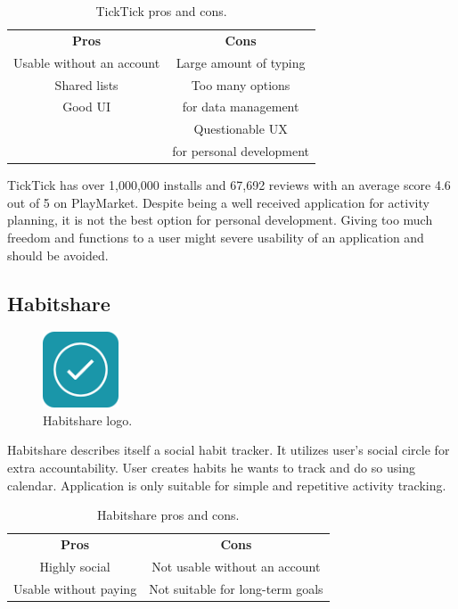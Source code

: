 \begin{table}[h!]
    \centering
    \begin{ctucolortab}
        \begin{tabular}{cc}
            \bfseries Pros & \bfseries Cons\\\Midrule
            Usable without an account & Large amount of typing \\
            Shared lists & Too many options \\
            Good UI & for data management \\
             & Questionable UX \\
             & for personal development \\
        \end{tabular}
    \end{ctucolortab}
    \caption{TickTick pros and cons.}\label{tab:ticktick-pros-cons}
\end{table}

TickTick has over 1,000,000 installs and 67,692 reviews with an average score 4.6 out of 5 on PlayMarket.
Despite being a well received application for activity planning, it is not the best option for personal development.
Giving too much freedom and functions to a user might severe usability of an application and should be avoided.


\subsection{Habitshare}\label{subsec:habitshare}

\begin{figure}[h!]
    \includegraphics[width=0.20\textwidth]{images/habitshare-logo.png}
    \caption{Habitshare logo.\cite{habitshare-logo}}
    \label{fig:habitshare-logo}
\end{figure}

Habitshare describes itself a social habit tracker.
It utilizes user's social circle for extra accountability.
User creates habits he wants to track and do so using calendar.
Application is only suitable for simple and repetitive activity tracking.

\begin{table}[h!]
    \centering
    \begin{ctucolortab}
        \begin{tabular}{cc}
            \bfseries Pros & \bfseries Cons\\\Midrule
            Highly social & Not usable without an account\\
            Usable without paying & Not suitable for long-term goals\\
        \end{tabular}
    \end{ctucolortab}
    \caption{Habitshare pros and cons.}\label{tab:habitshare-pros-cons}
\end{table}

